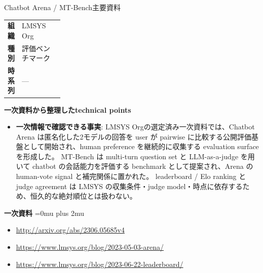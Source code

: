 \begin{technicalnote}{Chatbot Arena / MT-Bench}{主要資料}
\begingroup
\begin{tabularx}{\linewidth}{@{}>{\bfseries}p{0.22\linewidth}X@{}}
組織 & LMSYS Org \\
種別 & 評価ベンチマーク \\
時系列 & — \\
\end{tabularx}
\smallskip
{\bfseries 一次資料から整理したtechnical points}
\begin{itemize}[leftmargin=1.5em,itemsep=0.35em]
\item \textbf{一次情報で確認できる事実}: LMSYS Orgの選定済み一次資料では、Chatbot Arena は匿名化した2モデルの回答を user が pairwise に比較する公開評価基盤として開始され、human preference を継続的に収集する evaluation surface を形成した。 MT-Bench は multi-turn question set と LLM-as-a-judge を用いて chatbot の会話能力を評価する benchmark として提案され、Arena の human-vote signal と補完関係に置かれた。 leaderboard / Elo ranking と judge agreement は LMSYS の収集条件・judge model・時点に依存するため、恒久的な絶対順位とは扱わない。
\end{itemize}
\begin{minipage}{\linewidth}
\begin{samepage}
{\bfseries 一次資料}
\begingroup\sloppy
\Urlmuskip=0mu plus 2mu\relax
\begin{itemize}[leftmargin=1.5em,itemsep=0.25em]
\item {\scriptsize\url{http://arxiv.org/abs/2306.05685v4}}
\item {\scriptsize\url{https://www.lmsys.org/blog/2023-05-03-arena/}}
\item {\scriptsize\url{https://www.lmsys.org/blog/2023-06-22-leaderboard/}}
\end{itemize}
\endgroup
\end{samepage}
\end{minipage}
\endgroup
\end{technicalnote}
\medskip

